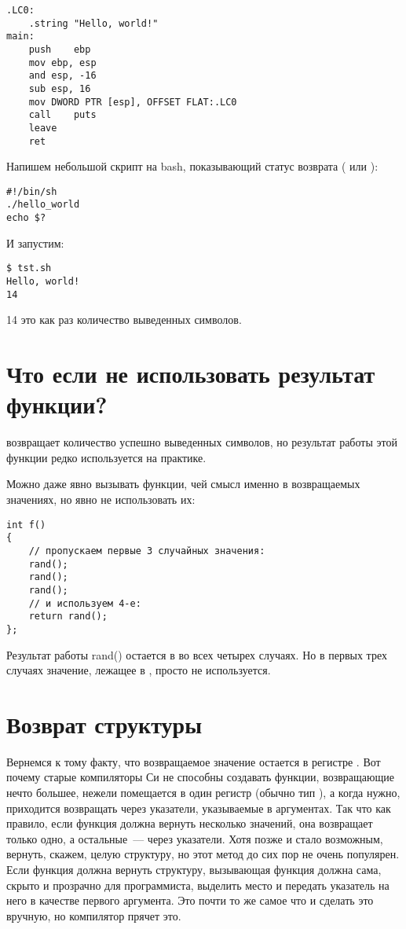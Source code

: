 \begin{lstlisting}[caption=GCC 4.8.1]
.LC0:
	.string	"Hello, world!"
main:
	push	ebp
	mov	ebp, esp
	and	esp, -16
	sub	esp, 16
	mov	DWORD PTR [esp], OFFSET FLAT:.LC0
	call	puts
	leave
	ret
\end{lstlisting}

Напишем небольшой скрипт на bash, показывающий статус возврата ( или ):

\begin{lstlisting}[caption=tst.sh]
#!/bin/sh
./hello_world
echo $?
\end{lstlisting}

И запустим:

\begin{lstlisting}
$ tst.sh 
Hello, world!
14
\end{lstlisting}

14 это как раз количество выведенных символов.

\section{Что если не использовать результат функции?}

\printf возвращает количество успешно выведенных символов, но результат работы этой функции 
редко используется на практике.

Можно даже явно вызывать функции, чей смысл именно в возвращаемых значениях, но явно не использовать их:

\begin{lstlisting}
int f()
{
    // пропускаем первые 3 случайных значения:
    rand();
    rand();
    rand();
    // и используем 4-е:
    return rand();
};
\end{lstlisting}

Результат работы rand() остается в \EAX во всех четырех случаях.
Но в первых трех случаях значение, лежащее в \EAX, просто не используется.

\section{Возврат структуры}

Вернемся к тому факту, что возвращаемое значение остается в регистре \EAX.
Вот почему старые компиляторы Си не способны создавать функции, возвращающие нечто большее, нежели 
помещается в один регистр (обычно тип \Tint), а когда нужно, приходится возвращать через указатели, указываемые 
в аргументах.
Так что как правило, если функция должна вернуть несколько значений, она возвращает только одно, 
а остальные~--- через указатели.
Хотя позже и стало возможным, вернуть, скажем, целую структуру, но этот метод до сих пор не 
очень популярен. 
Если функция должна вернуть структуру, вызывающая функция должна сама, скрыто и прозрачно для программиста, 
выделить место и передать указатель на него в качестве первого аргумента. Это почти то же самое 
что и сделать это вручную, но компилятор прячет это.

